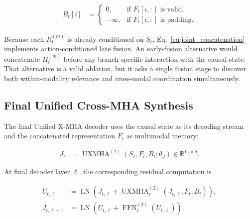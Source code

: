 \begin{equation}
\begin{aligned}
    B_t[i]
    &=
    \begin{cases}
        0,       & \text{if }F_t[i,:]\text{ is valid},\\
        -\infty, & \text{if }F_t[i,:]\text{ is padding}.
    \end{cases}
\end{aligned}
\label{eq:joint_fusion_mask}
\end{equation}

Because each $R_t^{(m)}$ is already conditioned on $S_t$, Eq.~\eqref{eq:joint_concatenation} implements action-conditioned late fusion. An early-fusion alternative would concatenate $H_t^{(m)}$ before any branch-specific interaction with the causal state. That alternative is a valid ablation, but it asks a single fusion stage to discover both within-modality relevance and cross-modal coordination simultaneously.

\subsection{\textbf{Final Unified Cross-MHA Synthesis}}

The final Unified X-MHA decoder uses the causal state as its decoding stream and the concatenated representation $F_t$ as multimodal memory:

\begin{equation}
\begin{aligned}
    J_t
    &= \operatorname{UXMHA}^{(2)}\!\left(
       S_t,F_t,B_t;\theta_J
       \right)
     \in\mathbb{R}^{L_t\times d}.
\end{aligned}
\label{eq:joint_final_decoder}
\end{equation}

At final decoder layer $\ell$, the corresponding residual computation is

\begin{equation}
\begin{aligned}
    U_{t,\ell}
    &= \operatorname{LN}\!\left(
       J_{t,\ell}+
       \operatorname{UXMHA}^{(2)}_{\ell}\!\left(
       J_{t,\ell},F_t,B_t
       \right)
       \right),\\
    J_{t,\ell+1}
    &= \operatorname{LN}\!\left(
       U_{t,\ell}+
       \operatorname{FFN}^{(2)}_{\ell}\!\left(U_{t,\ell}\right)
       \right).
\end{aligned}
\label{eq:joint_final_layer}
\end{equation}

